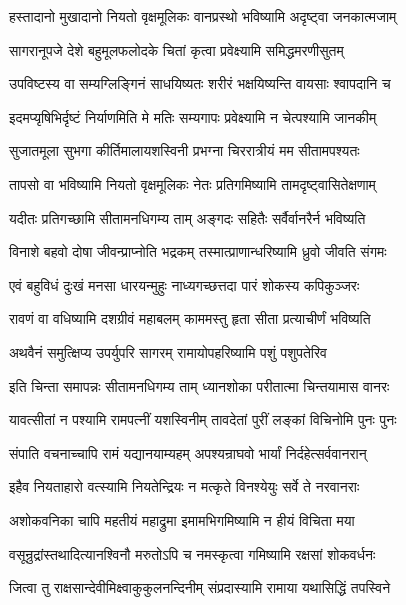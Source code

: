 \twolineshloka
{हस्तादानो मुखादानो नियतो वृक्षमूलिकः}
{वानप्रस्थो भविष्यामि अदृष्ट्वा जनकात्मजाम्} %

\twolineshloka
{सागरानूपजे देशे बहुमूलफलोदके}
{चितां कृत्वा प्रवेक्ष्यामि समिद्धमरणीसुतम्} %

\twolineshloka
{उपविष्टस्य वा सम्यग्लिङ्गिनं साधयिष्यतः}
{शरीरं भक्षयिष्यन्ति वायसाः श्वापदानि च} %

\twolineshloka
{इदमप्यृषिभिर्दृष्टं निर्याणमिति मे मतिः}
{सम्यगापः प्रवेक्ष्यामि न चेत्पश्यामि जानकीम्} %

\twolineshloka
{सुजातमूला सुभगा कीर्तिमालायशस्विनी}
{प्रभग्ना चिररात्रीयं मम सीतामपश्यतः} %

\twolineshloka
{तापसो वा भविष्यामि नियतो वृक्षमूलिकः}
{नेतः प्रतिगमिष्यामि तामदृष्ट्वासितेक्षणाम्} %

\twolineshloka
{यदीतः प्रतिगच्छामि सीतामनधिगम्य ताम्}
{अङ्गदः सहितैः सर्वैर्वानरैर्न भविष्यति} %

\twolineshloka
{विनाशे बहवो दोषा जीवन्प्राप्नोति भद्रकम्}
{तस्मात्प्राणान्धरिष्यामि ध्रुवो जीवति संगमः} %

\twolineshloka
{एवं बहुविधं दुःखं मनसा धारयन्मुहुः}
{नाध्यगच्छत्तदा पारं शोकस्य कपिकुञ्जरः} %

\twolineshloka
{रावणं वा वधिष्यामि दशग्रीवं महाबलम्}
{काममस्तु हृता सीता प्रत्याचीर्णं भविष्यति} %

\twolineshloka
{अथवैनं समुत्क्षिप्य उपर्युपरि सागरम्}
{रामायोपहरिष्यामि पशुं पशुपतेरिव} %

\twolineshloka
{इति चिन्ता समापन्नः सीतामनधिगम्य ताम्}
{ध्यानशोका परीतात्मा चिन्तयामास वानरः} %

\twolineshloka
{यावत्सीतां न पश्यामि रामपत्नीं यशस्विनीम्}
{तावदेतां पुरीं लङ्कां विचिनोमि पुनः पुनः} %

\twolineshloka
{संपाति वचनाच्चापि रामं यद्यानयाम्यहम्}
{अपश्यन्राघवो भार्यां निर्दहेत्सर्ववानरान्} %

\twolineshloka
{इहैव नियताहारो वत्स्यामि नियतेन्द्रियः}
{न मत्कृते विनश्येयुः सर्वे ते नरवानराः} %

\twolineshloka
{अशोकवनिका चापि महतीयं महाद्रुमा}
{इमामभिगमिष्यामि न हीयं विचिता मया} %

\twolineshloka
{वसून्रुद्रांस्तथादित्यानश्विनौ मरुतोऽपि च}
{नमस्कृत्वा गमिष्यामि रक्षसां शोकवर्धनः} %

\twolineshloka
{जित्वा तु राक्षसान्देवीमिक्ष्वाकुकुलनन्दिनीम्}
{संप्रदास्यामि रामाया यथासिद्धिं तपस्विने} %

